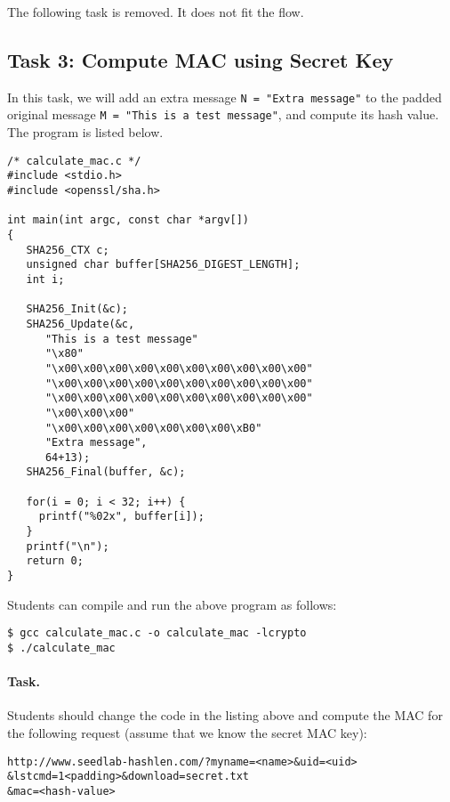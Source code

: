 





The following task is removed. It does not fit the flow.

\subsection{Task 3: Compute MAC using Secret Key}

In this task, we will add an extra message \texttt{N = "Extra message"}
to the padded original message \texttt{M = "This is a test message"},
and compute its hash value. The program is listed below.

\begin{lstlisting}
/* calculate_mac.c */
#include <stdio.h>
#include <openssl/sha.h>

int main(int argc, const char *argv[])
{
   SHA256_CTX c;
   unsigned char buffer[SHA256_DIGEST_LENGTH];
   int i;

   SHA256_Init(&c);
   SHA256_Update(&c,
      "This is a test message"
      "\x80"
      "\x00\x00\x00\x00\x00\x00\x00\x00\x00\x00"
      "\x00\x00\x00\x00\x00\x00\x00\x00\x00\x00"
      "\x00\x00\x00\x00\x00\x00\x00\x00\x00\x00"
      "\x00\x00\x00"
      "\x00\x00\x00\x00\x00\x00\x00\xB0"
      "Extra message",
      64+13);
   SHA256_Final(buffer, &c);

   for(i = 0; i < 32; i++) {
     printf("%02x", buffer[i]);
   }
   printf("\n");
   return 0;
}
\end{lstlisting}

Students can compile and run the above program as follows:

\begin{lstlisting}
$ gcc calculate_mac.c -o calculate_mac -lcrypto
$ ./calculate_mac
\end{lstlisting}


\paragraph{Task.}
Students should change the code in the listing above and compute
the MAC for the following request (assume that we know
the secret MAC key):

\begin{lstlisting}
http://www.seedlab-hashlen.com/?myname=<name>&uid=<uid>
&lstcmd=1<padding>&download=secret.txt
&mac=<hash-value>
\end{lstlisting}

